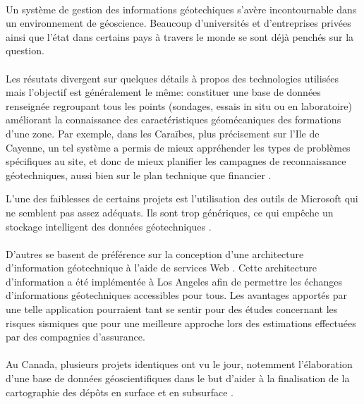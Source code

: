 \paragraph{}
Un système de gestion des informations géotechiques s'avère incontournable
dans un environnement de géoscience. Beaucoup d'universités et d'entreprises 
privées ainsi que l'état dans certains pays à travers le monde se sont déjà 
penchés sur la question. 
\paragraph{}
Les résutats divergent sur quelques détails à propos des technologies utilisées mais 
l'objectif est généralement le même: 
constituer une base de données renseignée regroupant tous les points (sondages, essais
in situ ou en laboratoire) améliorant la connaissance des caractéristiques géomécaniques des
formations d'une zone.
Par exemple, dans les Caraïbes, plus précisement sur l'Ile de Cayenne, un tel système a permis
de mieux appréhender les types de problèmes
spécifiques au site, et donc de mieux planifier les campagnes de reconnaissance
géotechniques, aussi bien sur le plan technique que financier
\cite{cayenne}.
\par 
L'une des faiblesses de certains projets est l'utilisation des outils de Microsoft
qui ne semblent pas assez 
adéquats. Ils sont trop génériques, ce qui empêche un stockage intelligent des données géotechniques
\cite{antoljak2012subsurface}.


\paragraph{}
D'autres se basent de préférence sur la conception d'une architecture d'information 
géotechnique à l'aide de services Web
\cite{zimmermann2003design}.
Cette architecture d'information a été implémentée à Los Angeles afin de permettre les échanges 
d'informations géotechniques accessibles pour tous. Les avantages apportés par une telle 
application pourraient tant se sentir pour des études concernant les risques sismiques que pour 
une meilleure approche lors des estimations effectuées par des compagnies d'assurance. 

\paragraph{}
Au Canada, plusieurs projets identiques ont vu le jour, notemment l'élabora\-tion d'une base 
de données géoscientifiques dans le but d’aider à la finalisation de la 
cartographie des dépôts en surface et en subsurface
\cite{russell1996regional}.

